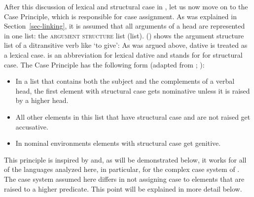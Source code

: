 








After this discussion of lexical and structural case in , let us now move on to the Case Principle,
which is responsible for case assignment. As was explained in Section~\ref{sec-linking}, it is assumed that all arguments of a
head are represented in one list: the \textsc{argument structure} list (\argst list). 
() shows the argument structure list of a ditransitive verb like  `to give':
\ea
{}
\z
As was argued above, dative is treated as a lexical case.  is an abbreviation for lexical
dative and  stands for for structural case. The Case
Principle has the following form (adapted from \citealp{Prze99}; \citealp{Meurers99b}):

\begin{principle-break}
\label{case-p}
\begin{itemize}
\item In a list that contains both the subject and the complements of a verbal head, the first
  element with structural case gets nominative unless it is raised by a higher head.
\item All other elements in this list that have structural case and are not raised get accusative.
\item In nominal environments elements with structural case get genitive.
\end{itemize}
\end{principle-break}
This principle is inspired by \citet*{YMJ87} and, as will be demonstrated below, it works for all of
the languages analyzed here, in particular, for the complex case system of . The case
system assumed here differs in not assigning case to elements that are raised
to a higher predicate. This point will be explained in more detail below.

